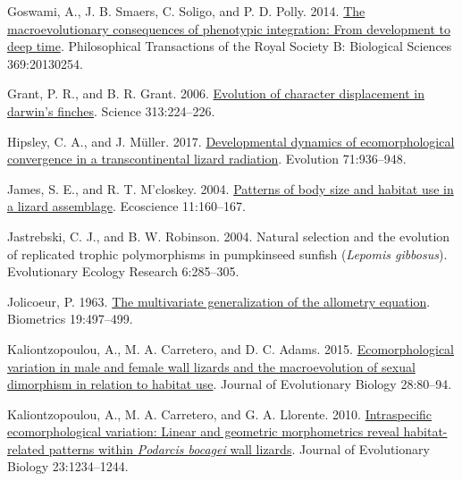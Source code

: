 \documentclass[
  11pt,
]{article}
\newlength{\cslhangindent}
\newlength{\cslentryspacingunit} %
\newenvironment{CSLReferences}[2] %
 {%
  \setlength{\parindent}{0pt}
  \ifodd #1
  \let\oldpar\par
  \def\par{\hangindent=\cslhangindent\oldpar}
  \fi
  \setlength{\parskip}{#2\cslentryspacingunit}
 }%
 {}
\begin{document}
\begin{CSLReferences}{1}{0}
\leavevmode{}%
Goswami, A., J. B. Smaers, C. Soligo, and P. D. Polly. 2014.
\href{https://doi.org/10.1098/rstb.2013.0254}{The macroevolutionary
consequences of phenotypic integration: From development to deep time}.
Philosophical Transactions of the Royal Society B: Biological Sciences
369:20130254.

\leavevmode{}%
Grant, P. R., and B. R. Grant. 2006.
\href{https://doi.org/10.1126/science.1128374}{Evolution of character
displacement in darwin's finches}. Science 313:224--226.

\leavevmode{}%
Hipsley, C. A., and J. Müller. 2017.
\href{https://doi.org/10.1111/evo.13186}{{Developmental dynamics of
ecomorphological convergence in a transcontinental lizard radiation}}.
Evolution 71:936--948.

\leavevmode{}%
James, S. E., and R. T. M'closkey. 2004.
\href{https://doi.org/10.1080/11956860.2004.11682820}{Patterns of body
size and habitat use in a lizard assemblage}. Ecoscience 11:160--167.

\leavevmode{}%
Jastrebski, C. J., and B. W. Robinson. 2004. Natural selection and the
evolution of replicated trophic polymorphisms in pumpkinseed sunfish
(\emph{{L}epomis gibbosus}). Evolutionary Ecology Research 6:285--305.

\leavevmode{}%
Jolicoeur, P. 1963. \href{https://doi.org/10.2307/2527939}{The
multivariate generalization of the allometry equation}. Biometrics
19:497--499.

\leavevmode{}%
Kaliontzopoulou, A., M. A. Carretero, and D. C. Adams. 2015.
\href{https://doi.org/10.1111/jeb.12540}{Ecomorphological variation in
male and female wall lizards and the macroevolution of sexual dimorphism
in relation to habitat use}. Journal of Evolutionary Biology 28:80--94.

\leavevmode{}%
Kaliontzopoulou, A., M. A. Carretero, and G. A. Llorente. 2010.
\href{https://doi.org/10.1111/j.1420-9101.2010.01984.x}{Intraspecific
ecomorphological variation: Linear and geometric morphometrics reveal
habitat-related patterns within \emph{{P}odarcis bocagei} wall lizards}.
Journal of Evolutionary Biology 23:1234--1244.


\end{CSLReferences}
\end{document}
